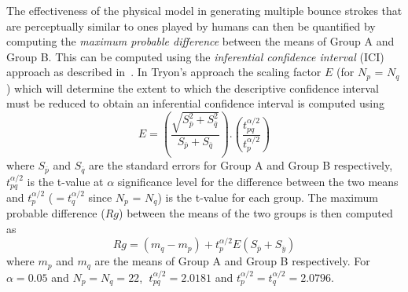 \documentclass[final,1p,times]{elsarticle}
\begin{document}
The effectiveness of the physical model in generating multiple bounce strokes that are perceptually similar to ones played by humans can then be quantified by computing the \textit{maximum probable difference} between the means of Group A and Group B. This can be computed using the \textit{inferential confidence interval} (ICI) approach as described in~\cite{tryon2001evaluating,tryon2008inferential}.
In Tryon's approach the scaling factor $E$ (for $N_p$ = $N_q$) which will determine the extent to which the descriptive confidence interval must be reduced to obtain an inferential confidence interval is computed using
\begin{equation}
E = \left(\frac{\sqrt{S_{\overline{p}}^{2} + S_{\overline{q}}^{2}}}{S_{\overline{p}} + S_{\overline{q}}}\right).\left(\frac{t_{pq}^{\alpha/2}}{t_{p}^{\alpha/2}}\right)
\end{equation}
where $S_{\overline{p}}$ and $S_{\overline{q}}$ are the standard errors for Group A and Group B respectively, $t_{pq}^{\alpha/2}$ is the t-value at $\alpha$ significance level for the difference between the two means and $t_{p}^{\alpha/2}$ ($= t_{q}^{\alpha/2}$ since $N_p$ = $N_q$) is the t-value for each group. 
The maximum probable difference ($Rg$) between the means of the two groups is then computed as 
\begin{equation}
Rg = (m_q - m_p) + t_{p}^{\alpha/2}E(S_{\overline{p}} + S_{\overline{y}}) 
\end{equation}
where $m_p$ and $m_q$ are the means of Group A and Group B respectively.
For $\alpha=0.05$ and $N_p = N_q = 22$, $\;t_{pq}^{\alpha/2} = 2.0181$ and $t_{p}^{\alpha/2} = t_{q}^{\alpha/2} = 2.0796$.


\end{document}
